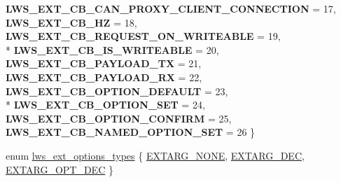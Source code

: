 \begin{DoxyCompactItemize}
{\bfseries L\+W\+S\+\_\+\+E\+X\+T\+\_\+\+C\+B\+\_\+\+C\+A\+N\+\_\+\+P\+R\+O\+X\+Y\+\_\+\+C\+L\+I\+E\+N\+T\+\_\+\+C\+O\+N\+N\+E\+C\+T\+I\+ON} = 17, 
{\bfseries L\+W\+S\+\_\+\+E\+X\+T\+\_\+\+C\+B\+\_\+HZ} = 18, 
{\bfseries L\+W\+S\+\_\+\+E\+X\+T\+\_\+\+C\+B\+\_\+\+R\+E\+Q\+U\+E\+S\+T\+\_\+\+O\+N\+\_\+\+W\+R\+I\+T\+E\+A\+B\+LE} = 19, 
\\*
{\bfseries L\+W\+S\+\_\+\+E\+X\+T\+\_\+\+C\+B\+\_\+\+I\+S\+\_\+\+W\+R\+I\+T\+E\+A\+B\+LE} = 20, 
{\bfseries L\+W\+S\+\_\+\+E\+X\+T\+\_\+\+C\+B\+\_\+\+P\+A\+Y\+L\+O\+A\+D\+\_\+\+TX} = 21, 
{\bfseries L\+W\+S\+\_\+\+E\+X\+T\+\_\+\+C\+B\+\_\+\+P\+A\+Y\+L\+O\+A\+D\+\_\+\+RX} = 22, 
{\bfseries L\+W\+S\+\_\+\+E\+X\+T\+\_\+\+C\+B\+\_\+\+O\+P\+T\+I\+O\+N\+\_\+\+D\+E\+F\+A\+U\+LT} = 23, 
\\*
{\bfseries L\+W\+S\+\_\+\+E\+X\+T\+\_\+\+C\+B\+\_\+\+O\+P\+T\+I\+O\+N\+\_\+\+S\+ET} = 24, 
{\bfseries L\+W\+S\+\_\+\+E\+X\+T\+\_\+\+C\+B\+\_\+\+O\+P\+T\+I\+O\+N\+\_\+\+C\+O\+N\+F\+I\+RM} = 25, 
{\bfseries L\+W\+S\+\_\+\+E\+X\+T\+\_\+\+C\+B\+\_\+\+N\+A\+M\+E\+D\+\_\+\+O\+P\+T\+I\+O\+N\+\_\+\+S\+ET} = 26
 \}\hypertarget{group__extensions_gae9993815eee72c6070300a0ae2f022d7}{}\label{group__extensions_gae9993815eee72c6070300a0ae2f022d7}

\item 
enum \hyperlink{group__extensions_gacc9f55936dc165257a2e1f7d47bce89e}{lws\+\_\+ext\+\_\+options\+\_\+types} \{ \hyperlink{group__extensions_ggacc9f55936dc165257a2e1f7d47bce89eaabcf56c456c1ff6e81dc82586a16f14c}{E\+X\+T\+A\+R\+G\+\_\+\+N\+O\+NE}, 
\hyperlink{group__extensions_ggacc9f55936dc165257a2e1f7d47bce89ea1c86adf924c8786a12bee9687094673e}{E\+X\+T\+A\+R\+G\+\_\+\+D\+EC}, 
\hyperlink{group__extensions_ggacc9f55936dc165257a2e1f7d47bce89ea5265abe3e1c3f64412f2affe7bffd880}{E\+X\+T\+A\+R\+G\+\_\+\+O\+P\+T\+\_\+\+D\+EC}
 \}
\end{DoxyCompactItemize}
